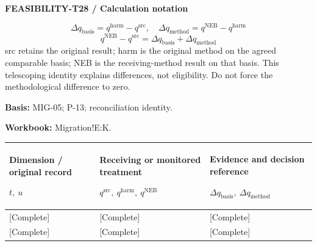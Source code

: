 \Needspace{112mm}
\par\begingroup\sffamily\fontsize{8}{10}\selectfont\color{NEBGreen}\setlength{\parskip}{2pt}\setlength{\abovedisplayskip}{4pt}\setlength{\belowdisplayskip}{4pt}\setlength{\abovedisplayshortskip}{2pt}\setlength{\belowdisplayshortskip}{3pt}
\textbf{FEASIBILITY-T28 / Calculation notation}\par
{\fontsize{9}{11}\selectfont\[ \Delta q_{\mathrm{basis}}=q^{\mathrm{harm}}-q^{\mathrm{src}},\quad \Delta q_{\mathrm{method}}=q^{\mathrm{NEB}}-q^{\mathrm{harm}} \]}
{\fontsize{9}{11}\selectfont\[ q^{\mathrm{NEB}}-q^{\mathrm{src}}=\Delta q_{\mathrm{basis}}+\Delta q_{\mathrm{method}} \]}
src retains the original result; harm is the original method on the agreed comparable basis; NEB is the receiving-method result on that basis. This telescoping identity explains differences, not eligibility. Do not force the methodological difference to zero.\par
\textbf{Basis:} MIG-05; P-13; reconciliation identity.\par
\textbf{Workbook:} Migration!E:K.\par\endgroup
{\sffamily\fontsize{8.3}{10.3}\selectfont\begin{longtable}{@{}P{54.83mm} P{54.83mm} P{54.83mm}@{}}
\toprule
\textbf{Dimension / original record}\par {\normalfont\fontsize{8.2}{10}\selectfont $t,\ u$} & \textbf{Receiving or monitored treatment}\par {\normalfont\fontsize{8.2}{10}\selectfont $q^{\mathrm{src}},\ q^{\mathrm{harm}},\ q^{\mathrm{NEB}}$} & \textbf{Evidence and decision reference}\par {\normalfont\fontsize{8.2}{10}\selectfont $\Delta q_{\mathrm{basis}},\ \Delta q_{\mathrm{method}}$}\\\midrule\endhead
\rule{0pt}{8mm}[Complete] & [Complete] & [Complete]\\\hline
\rule{0pt}{8mm}[Complete] & [Complete] & [Complete]\\\hline
\end{longtable}}

